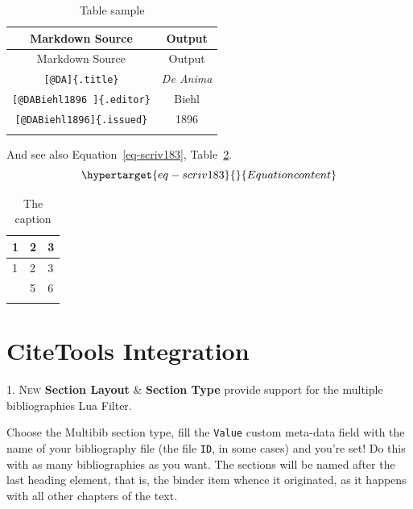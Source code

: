 \documentclass[
  12pt,
  a4paper,
  numbers=noenddot,
  titlepage,
  toclink=all,
  toc=bibliography]{scrbook}
\theoremstyle{definition}
\theoremstyle{definition}
\theoremstyle{definition}
\theoremstyle{plain}
\theoremstyle{plain}
\theoremstyle{plain}
\theoremstyle{plain}
\theoremstyle{plain}
\theoremstyle{remark}
\begin{document}
\hypertarget{tbl-scriv182}{}
\begin{longtable}[]{@{}cc@{}}
\toprule\noalign{}
Markdown Source & Output \\
\midrule\noalign{}
\endfirsthead
\toprule\noalign{}
Markdown Source & Output \\
\midrule\noalign{}
\endhead
\bottomrule\noalign{}
\endlastfoot
\texttt{{[}@DA{]}\{.title\}} & \emph{De Anima} \\
\texttt{{[}@DABiehl1896\ {]}\{.editor\}} & Biehl \\
\texttt{{[}@DABiehl1896{]}\{.issued\}} & 1896 \\
\caption{\label{tbl-scriv182}Table sample}\tabularnewline
\end{longtable}

And see also
\protect\hypertarget{cite_57}{}{\label{cite_57}Equation~\ref{eq-scriv183}},
\protect\hypertarget{cite_58}{}{\label{cite_58}Table~\ref{tbl-scriv184}}.\\
\begin{equation}\protect\hypertarget{eq-scriv183}{}{Equation content
}\label{eq-scriv183}\end{equation}

\hypertarget{tbl-scriv184}{}
\begin{longtable}[]{@{}lll@{}}
\toprule\noalign{}
1 & 2 & 3 \\
\midrule\noalign{}
\endfirsthead
\toprule\noalign{}
1 & 2 & 3 \\
\midrule\noalign{}
\endhead
\bottomrule\noalign{}
\endlastfoot
4 & 5 & 6 \\
\caption{\label{tbl-scriv184}The caption}\tabularnewline
\end{longtable}

\hypertarget{sec-scriv185}{%
\section{CiteTools Integration}\label{sec-scriv185}}

\protect\hypertarget{scriv185}{}{}

\protect\hypertarget{scriv186}{}{} \textsc{1. New} \textbf{Section
Layout} \& \textbf{Section Type} provide support for the multiple
bibliographies Lua Filter.

Choose the Multibib section type, fill the \texttt{Value} custom
meta-data field with the name of your bibliography file (the file
\texttt{ID}, in some cases) and you're set! Do this with as many
bibliographies as you want. The sections will be named after the last
heading element, that is, the binder item whence it originated, as it
happens with all other chapters of the text.
\end{document}
